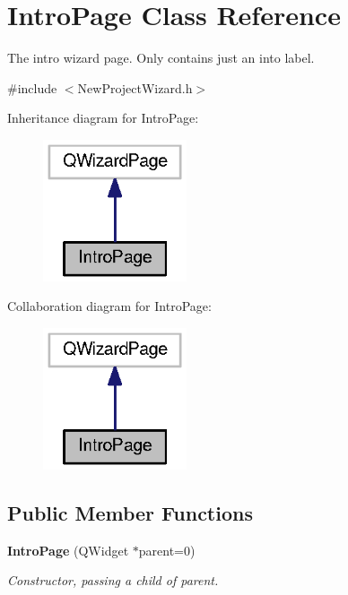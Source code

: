 \section{Intro\-Page Class Reference}
\label{class_intro_page}


The intro wizard page. Only contains just an into label.  




{\ttfamily \#include $<$New\-Project\-Wizard.\-h$>$}



Inheritance diagram for Intro\-Page\-:\nopagebreak
\begin{figure}[H]
\begin{center}
\leavevmode
\includegraphics[width=120pt]{class_intro_page__inherit__graph}
\end{center}
\end{figure}


Collaboration diagram for Intro\-Page\-:\nopagebreak
\begin{figure}[H]
\begin{center}
\leavevmode
\includegraphics[width=120pt]{class_intro_page__coll__graph}
\end{center}
\end{figure}
\subsection*{Public Member Functions}
\begin{DoxyCompactItemize}
\item 
{\bf Intro\-Page} (Q\-Widget $\ast$parent=0)
\begin{DoxyCompactList}\small\item\em Constructor, passing a child of parent. \end{DoxyCompactList}\end{DoxyCompactItemize}
